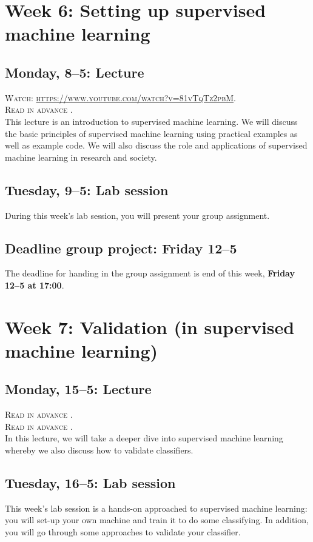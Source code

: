 \section*{Week 6: Setting up supervised machine learning}

\subsection*{Monday, 8--5: Lecture}
\textsc{ Watch: \url{https://www.youtube.com/watch?v=81vTqTz2pbM}.}\\
\textsc{ Read in advance \cite{van_zoonen_social_2016}.}\\

This lecture is an introduction to supervised machine learning. We will discuss the basic principles of supervised machine learning using practical examples as well as example code. We will also discuss the role and applications of supervised machine learning in research and society.

\subsection*{Tuesday, 9--5: Lab session}
During this week's lab session, you will present your group assignment.

\subsection*{Deadline group project: Friday 12--5}
The deadline for handing in the group assignment is end of this week, \textbf{Friday 12--5 at 17:00}.

\section*{Week 7: Validation (in supervised machine learning)}
\subsection*{Monday, 15--5: Lecture}
\textsc{ Read in advance \cite{jordan_mitchell}.} \\
\textsc{ Read in advance \cite{meppelink_reliable_2021}.}\\

In this lecture, we will take a deeper dive into supervised machine learning whereby we also discuss how to validate classifiers.

\subsection*{Tuesday, 16--5: Lab session}
This week's lab session is a hands-on approached to supervised machine learning: you will set-up your own machine and train it to do some classifying. In addition, you will go through some approaches to validate your classifier.

